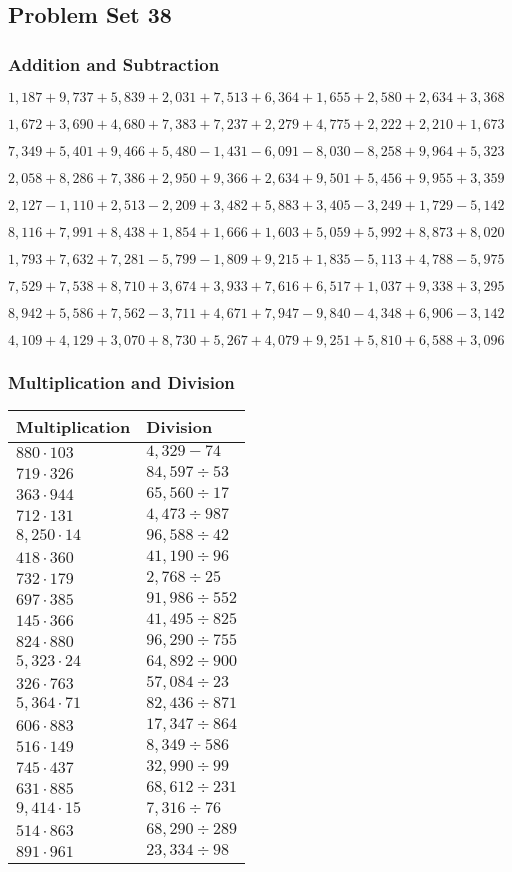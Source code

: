 \hypertarget{problem-set-38-3}{%
\subsection{Problem Set 38}\label{problem-set-38-3}}

\hypertarget{addition-and-subtraction-200}{%
\subsubsection{Addition and
Subtraction}\label{addition-and-subtraction-200}}

\(1,187+9,737+5,839+2,031+7,513+6,364+1,655+2,580+2,634+ 3,368\)

\(1,672+3,690+4,680+7,383+7,237+2,279+4,775+2,222+2,210+1,673\)

\(7,349+5,401+9,466+5,480-1,431-6,091-8,030-8,258+9,964+5,323\)

\(2,058+8,286+7,386+2,950+9,366+2,634+9,501+5,456+9,955+3,359\)

\(2,127-1,110+2,513-2,209+3,482+5,883+3,405-3,249+1,729-5,142\)

\(8,116+7,991+8,438+1,854+1,666+1,603+5,059+5,992+8,873+8,020\)

\(1,793+7,632+7,281-5,799-1,809+9,215+1,835-5,113+4,788-5,975\)

\(7,529+7,538+8,710+3,674+3,933+7,616+6,517+1,037+9,338+3,295\)

\(8,942+5,586+7,562-3,711+4,671+7,947-9,840-4,348+6,906-3,142\)

\(4,109+4,129+3,070+8,730+5,267+4,079+9,251+5,810+6,588+3,096\)

\hypertarget{multiplication-and-division-199}{%
\subsubsection{Multiplication and
Division}\label{multiplication-and-division-199}}

\begin{longtable}[]{@{}ll@{}}
\toprule
Multiplication & Division\tabularnewline
\midrule
\endhead
\(880\cdot103\) & \(4,329-74\)\tabularnewline
\(719\cdot326\) & \(84,597÷53\)\tabularnewline
\(363\cdot944\) & \(65,560÷17\)\tabularnewline
\(712\cdot131\) & \(4,473÷987\)\tabularnewline
\(8,250\cdot14\) & \(96,588÷42\)\tabularnewline
\(418\cdot360\) & \(41,190÷96\)\tabularnewline
\(732\cdot179\) & \(2,768÷25\)\tabularnewline
\(697\cdot385\) & \(91,986÷552\)\tabularnewline
\(145\cdot366\) & \(41,495÷825\)\tabularnewline
\(824\cdot880\) & \(96,290÷755\)\tabularnewline
\(5,323\cdot24\) & \(64,892÷900\)\tabularnewline
\(326\cdot763\) & \(57,084÷23\)\tabularnewline
\(5,364\cdot71\) & \(82,436÷871\)\tabularnewline
\(606\cdot883\) & \(17,347÷864\)\tabularnewline
\(516\cdot149\) & \(8,349÷586\)\tabularnewline
\(745\cdot437\) & \(32,990÷99\)\tabularnewline
\(631\cdot885\) & \(68,612÷231\)\tabularnewline
\(9,414\cdot15\) & \(7,316÷76\)\tabularnewline
\(514\cdot863\) & \(68,290÷289\)\tabularnewline
\(891\cdot961\) & \(23,334÷98\)\tabularnewline
\bottomrule
\end{longtable}

